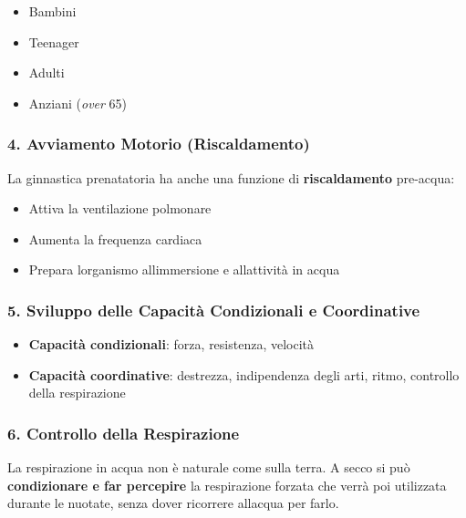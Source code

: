 \documentclass[a4paper,11pt]{article}
\providecommand{\tightlist}{%
  \setlength{\itemsep}{0pt}\setlength{\parskip}{0pt}}
\begin{document}
\begin{itemize}
      \tightlist
      \item
            Bambini
      \item
            Teenager
      \item
            Adulti
      \item
            Anziani (\emph{over} 65)
\end{itemize}

\subsubsection{4. Avviamento Motorio
      (Riscaldamento)}\label{avviamento-motorio-riscaldamento}

La ginnastica prenatatoria ha anche una funzione di
\textbf{riscaldamento} pre-acqua:

\begin{itemize}
      \tightlist
      \item
            Attiva la ventilazione polmonare
      \item
            Aumenta la frequenza cardiaca
      \item
            Prepara l\textquotesingle organismo all\textquotesingle immersione e
            all\textquotesingle attività in acqua
\end{itemize}

\subsubsection{5. Sviluppo delle Capacità Condizionali e
      Coordinative}\label{sviluppo-delle-capacituxe0-condizionali-e-coordinative}

\begin{itemize}
      \tightlist
      \item
            \textbf{Capacità condizionali}: forza, resistenza, velocità
      \item
            \textbf{Capacità coordinative}: destrezza, indipendenza degli arti,
            ritmo, controllo della respirazione
\end{itemize}

\subsubsection{6. Controllo della
      Respirazione}\label{controllo-della-respirazione}

La respirazione in acqua non è naturale come sulla terra. A secco si può
\textbf{condizionare e far percepire} la respirazione forzata che verrà
poi utilizzata durante le nuotate, senza dover ricorrere
all\textquotesingle acqua per farlo.
\end{document}
